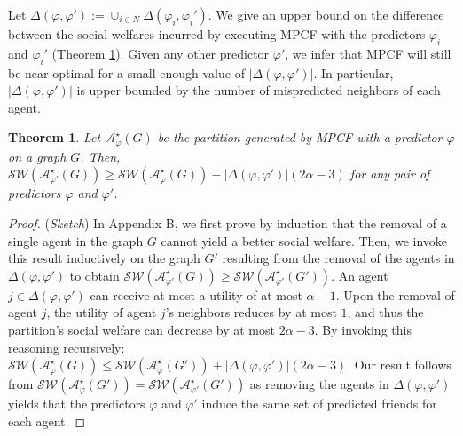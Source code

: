 \documentclass[letterpaper]{article} %
\newtheorem{theorem}{Theorem}
\newtheorem{lemma}{Lemma}
\begin{document}
Let $\Delta(\varphi,\varphi') := \cup_{i \in N} \Delta(\varphi_i,\varphi_i')$. We give an upper bound on the difference between the social welfares incurred by executing MPCF with the predictors $\varphi_i$ and $\varphi_i'$ (Theorem \ref{thm:noisy}). Given any other predictor $\varphi'$, we infer that MPCF will still be near-optimal for a small enough value of $|\Delta(\varphi,\varphi')|$. In particular, $|\Delta(\varphi,\varphi')|$ is upper bounded by the number of mispredicted neighbors of each agent.

\begin{theorem}
    \label{thm:noisy}
    Let $\mathcal{A}^\star_{\varphi}(G)$ be the partition generated by MPCF with a predictor $\varphi$ on a graph $G$. Then, $\mathcal{SW}(\mathcal{A}^\star_{\varphi'}(G)) \geq \mathcal{SW}(\mathcal{A}^\star_{\varphi}(G)) - |\Delta(\varphi,\varphi')|(2\alpha-3)$ for any pair of predictors $\varphi$ and $\varphi'$.
\end{theorem}
\begin{proof}
    (\textit{Sketch})
    In Appendix B, we first prove by induction that the removal of a single agent in the graph $G$ cannot yield a better social welfare. Then, we invoke this result inductively on the graph $G'$ resulting from the removal of the agents in $\Delta(\varphi,\varphi')$ to obtain $\mathcal{SW}(\mathcal{A}^\star_{\varphi'}(G)) \geq \mathcal{SW}(\mathcal{A}^\star_{\varphi'}(G'))$. An agent $j \in \Delta(\varphi,\varphi')$ can receive at most a utility of at most $\alpha-1$. Upon the removal of agent $j$, the utility of agent $j$'s neighbors reduces by at most $1$, and thus the partition's social welfare can decrease by at most $2\alpha - 3$. By invoking this reasoning recursively: $\mathcal{SW}(\mathcal{A}^\star_{\varphi}(G)) \leq \mathcal{SW}(\mathcal{A}^\star_{\varphi}(G')) + |\Delta(\varphi,\varphi')|(2\alpha-3)$. Our result follows from $\mathcal{SW}(\mathcal{A}^\star_{\varphi}(G')) = \mathcal{SW}(\mathcal{A}^\star_{\varphi'}(G'))$ as removing the agents in $\Delta(\varphi,\varphi')$ yields that the predictors $\varphi$ and $\varphi'$ induce the same set of predicted friends for each agent.
\end{proof}
\end{document}

